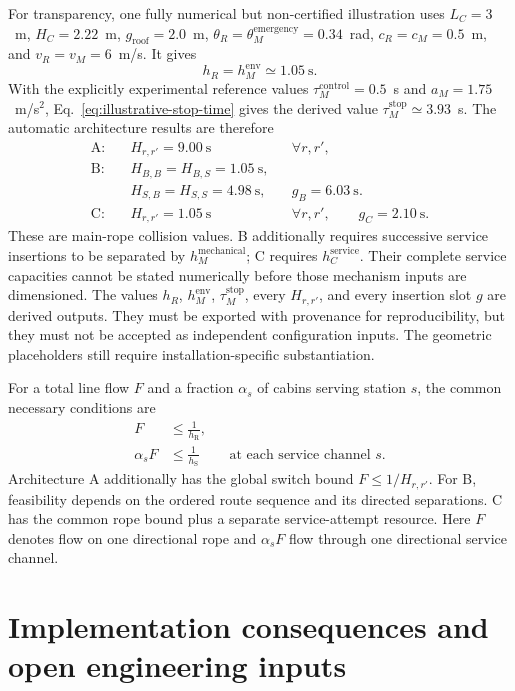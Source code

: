 \documentclass[11pt,a4paper]{scrartcl}
\newcommand{\hlinehaul}{h_{\mathrm R}}
\newcommand{\hservice}{h_{\mathrm S}}
\begin{document}
For transparency, one fully numerical but non-certified illustration uses
$L_C=3$~m, $H_C=2.22$~m, $g_{\mathrm{roof}}=2.0$~m, $\theta_R=
\theta_M^{\mathrm{emergency}}=0.34$~rad, $c_R=c_M=0.5$~m, and
$v_R=v_M=6$~m/s.  It gives
\[
h_R=h_M^{\mathrm{env}}\simeq1.05\ \mathrm{s}.
\]
With the explicitly experimental reference values
$\tau_M^{\mathrm{control}}=0.5$~s and $a_M=1.75$~m/s$^2$,
Eq.~\eqref{eq:illustrative-stop-time} gives the derived value
$\tau_M^{\mathrm{stop}}\simeq3.93$~s.  The automatic architecture results are
therefore
\begin{align*}
\text{A:}\quad&H_{r,r'}=9.00\ \mathrm{s}
  &&\forall r,r',\\
\text{B:}\quad&H_{B,B}=H_{B,S}=1.05\ \mathrm{s},\\
&H_{S,B}=H_{S,S}=4.98\ \mathrm{s},
  &&g_B=6.03\ \mathrm{s}.
\\[-0.25em]
\text{C:}\quad&H_{r,r'}=1.05\ \mathrm{s}
  &&\forall r,r',\qquad g_C=2.10\ \mathrm{s}.
\end{align*}
These are main-rope collision values.  B additionally requires successive
service insertions to be separated by $h_M^{\mathrm{mechanical}}$; C requires
$h_C^{\mathrm{service}}$.  Their complete service capacities cannot be stated
numerically before those mechanism inputs are dimensioned.
The values $h_R$, $h_M^{\mathrm{env}}$, $\tau_M^{\mathrm{stop}}$, every
$H_{r,r'}$, and every insertion slot $g$ are derived outputs.  They must be
exported with provenance for reproducibility, but they must not be accepted as
independent configuration inputs.  The geometric placeholders still require
installation-specific substantiation.

For a total line flow $F$ and a fraction $\alpha_s$ of cabins serving station
$s$, the common necessary conditions are
\begin{align}
F &\le \frac{1}{\hlinehaul}, \\
\alpha_sF &\le \frac{1}{\hservice} &&\text{at each service channel }s.
\end{align}
Architecture A additionally has the global switch bound
$F\le1/H_{r,r'}$.  For B, feasibility depends on the ordered route sequence and
its directed separations.  C has the common rope bound plus a separate
service-attempt resource.  Here $F$ denotes flow on one directional rope and
$\alpha_sF$ flow through one directional service channel.

\section{Implementation consequences and open engineering inputs}
\end{document}
